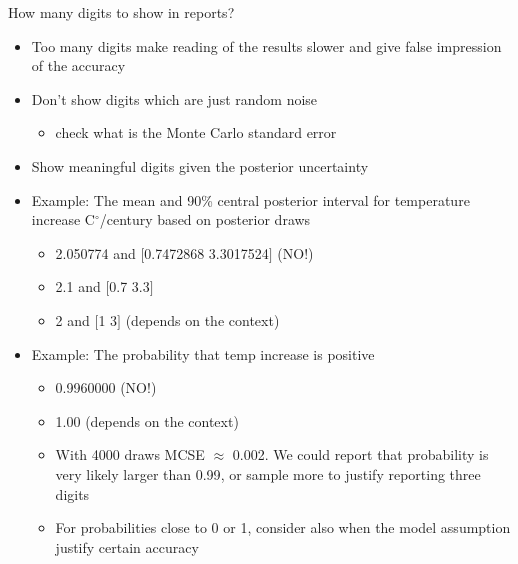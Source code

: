 \documentclass[finnish,english,t]{beamer}
\begin{document}
\begin{frame}{How many digits to show in reports?}

\vspace{-0.5\baselineskip}  
  \begin{itemize}
  \item Too many digits make reading of the results slower and give
    false impression of the accuracy
  \item<2-> Don't show digits which are just random noise
    \begin{itemize}
    \item check what is the Monte Carlo standard error
    \end{itemize}
  \item<3-> Show meaningful digits given the posterior uncertainty
  \item<4-> Example: The mean and 90\% central posterior interval for temperature
     increase C$^\circ$/century based on posterior draws
     \begin{itemize}
     \item<5-> {\color{red} 2.050774 and $[$0.7472868 3.3017524$]$} (NO!)
     \item<6-> {\color{darkgreen} 2.1 and $[$0.7 3.3$]$}
    \item<7-> {\color{navyblue} 2 and $[$1 3$]$} (depends on the context)
     \end{itemize}
   \item<8-> Example: The probability that temp increase is
     positive
     \begin{itemize}
     \item<9-> {\color{red} 0.9960000} (NO!)
     \item<10-> {\color{navyblue} 1.00} (depends on the context)
     \item<11-> With 4000 draws MCSE $\approx$ 0.002. We could report
       that probability is {\color{darkgreen} very likely larger than 0.99}, or sample
       more to justify reporting three digits
     \item<12-> For probabilities close to 0 or 1, consider also when
       the model assumption justify certain accuracy
     \end{itemize}
  \end{itemize}

  
\end{frame}
\end{document}
